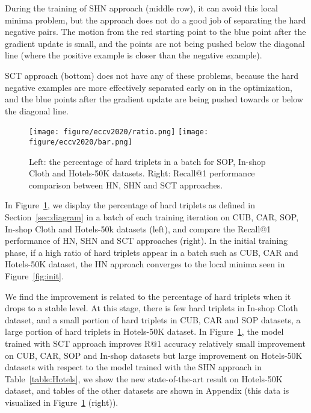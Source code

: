 \documentclass[runningheads]{llncs}
\begin{document}
During the training of SHN approach (middle row), it can avoid this local minima problem, but the approach does not do a good job of separating the hard negative pairs. The motion from the red starting point to the blue point after the gradient update is small, and the points are not being pushed below the diagonal line (where the positive example is closer than the negative example).

SCT approach (bottom) does not have any of these problems, because the hard negative examples are more effectively separated early on in the optimization, and the blue points after the gradient update are being pushed towards or below the diagonal line.

\begin{figure}
    \centering
    \texttt{[image: figure/eccv2020/ratio.png]}
    \texttt{[image: figure/eccv2020/bar.png]}
    \caption{Left: the percentage of hard triplets in a batch for SOP, In-shop Cloth and Hotels-50K datasets. Right: Recall@1 performance comparison between HN, SHN and SCT approaches.}
    \label{fig:percentage}
\end{figure}

In Figure~\ref{fig:percentage}, we display the percentage of hard triplets as defined in Section~\ref{sec:diagram} in a batch of each training iteration on CUB, CAR, SOP, In-shop Cloth and Hotels-50k datasets (left), and compare the Recall@1 performance of HN, SHN and SCT approaches (right). In the initial training phase, if a high ratio of hard triplets appear in a batch such as CUB, CAR and Hotels-50K dataset, the HN approach converges to the local minima seen in Figure~\ref{fig:init}. 

We find the improvement is related to the percentage of hard triplets when it drops to a stable level. At this stage, there is few hard triplets in In-shop Cloth dataset, and a small portion of hard triplets in CUB, CAR and SOP datasets, a large portion of hard triplets in Hotels-50K dataset.  In Figure~\ref{fig:percentage}, the model trained with SCT approach improves R@1 accuracy relatively small improvement on CUB, CAR, SOP and In-shop datasets but large improvement on Hotels-50K datasets with respect to the model trained with the SHN approach in Table~\ref{table:Hotels}, we show the new state-of-the-art result on Hotels-50K dataset, and tables of the other datasets are shown in Appendix (this data is visualized in Figure~\ref{fig:percentage} (right)).
\end{document}
